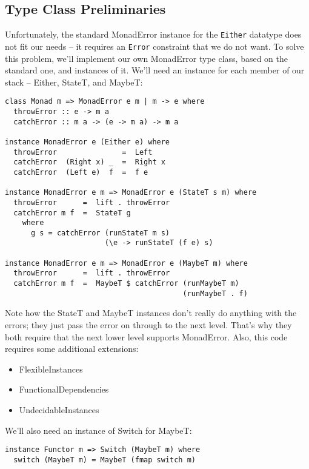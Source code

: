 \documentclass{tmr}
\begin{document}
\subsection{Type Class Preliminaries}
Unfortunately, the standard MonadError instance for the \verb+Either+ datatype does
not fit our needs -- it requires an \verb+Error+ constraint that we do not want.  To
solve this problem, we'll implement our own MonadError type class, based on the
standard one, and instances of it.  We'll need an instance for each member of
our stack -- Either, StateT, and MaybeT: 
\begin{verbatim}
class Monad m => MonadError e m | m -> e where
  throwError :: e -> m a
  catchError :: m a -> (e -> m a) -> m a

instance MonadError e (Either e) where
  throwError               =  Left
  catchError  (Right x) _  =  Right x
  catchError  (Left e)  f  =  f e
  
instance MonadError e m => MonadError e (StateT s m) where
  throwError      =  lift . throwError
  catchError m f  =  StateT g
    where
      g s = catchError (runStateT m s) 
                       (\e -> runStateT (f e) s)

instance MonadError e m => MonadError e (MaybeT m) where
  throwError      =  lift . throwError
  catchError m f  =  MaybeT $ catchError (runMaybeT m) 
                                         (runMaybeT . f)
\end{verbatim}
Note how the StateT and MaybeT instances don't really do anything with the
errors; they just pass the error on through to the next level.  That's why they
both require that the next lower level supports MonadError.  Also, this code 
requires some additional extensions:
\begin{itemize}
  \item FlexibleInstances
  \item FunctionalDependencies
  \item UndecidableInstances 
\end{itemize}

We'll also need an instance of Switch for MaybeT:
\begin{verbatim}
instance Functor m => Switch (MaybeT m) where
  switch (MaybeT m) = MaybeT (fmap switch m)
\end{verbatim}
\end{document}
